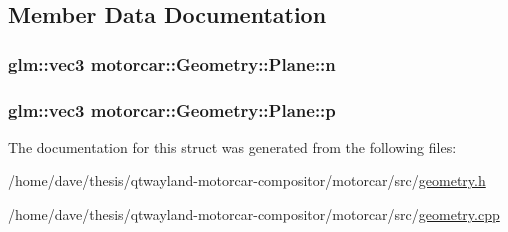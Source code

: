 \subsection{Member Data Documentation}
\hypertarget{structmotorcar_1_1Geometry_1_1Plane_adc343be1d51473ca22505d7427a7631c}{
\subsubsection[{n}]{\setlength{\rightskip}{0pt plus 5cm}glm\-::vec3 motorcar\-::\-Geometry\-::\-Plane\-::n}}\label{structmotorcar_1_1Geometry_1_1Plane_adc343be1d51473ca22505d7427a7631c}
\hypertarget{structmotorcar_1_1Geometry_1_1Plane_ad1aa2ffa451147b0fe911f5b78c10500}{
\subsubsection[{p}]{\setlength{\rightskip}{0pt plus 5cm}glm\-::vec3 motorcar\-::\-Geometry\-::\-Plane\-::p}}\label{structmotorcar_1_1Geometry_1_1Plane_ad1aa2ffa451147b0fe911f5b78c10500}


The documentation for this struct was generated from the following files\-:\begin{DoxyCompactItemize}
\item 
/home/dave/thesis/qtwayland-\/motorcar-\/compositor/motorcar/src/\hyperlink{geometry_8h}{geometry.\-h}\item 
/home/dave/thesis/qtwayland-\/motorcar-\/compositor/motorcar/src/\hyperlink{geometry_8cpp}{geometry.\-cpp}\end{DoxyCompactItemize}
